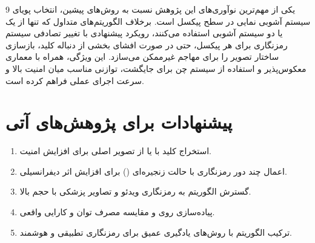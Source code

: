یکی از مهم‌ترین نوآوری‌های این پژوهش نسبت به روش‌های پیشین، انتخاب پویای 9 سیستم آشوبی نمایی در سطح پیکسل است. برخلاف الگوریتم‌های متداول که تنها از یک یا دو سیستم آشوبی استفاده می‌کنند، رویکرد پیشنهادی با تغییر تصادفی سیستم رمزنگاری برای هر پیکسل، حتی در صورت افشای بخشی از دنباله کلید، بازسازی ساختار تصویر را برای مهاجم غیرممکن می‌سازد. این ویژگی، همراه با معماری معکوس‌پذیر و استفاده از سیستم چن برای جایگشت، توازنی مناسب میان امنیت بالا و سرعت اجرای عملی فراهم کرده است.

\section{پیشنهادات برای پژوهش‌های آتی}
\begin{enumerate}
    \item استخراج کلید با  یا  از تصویر اصلی برای افزایش امنیت.
    \item اعمال چند دور رمزنگاری با حالت زنجیره‌ای () برای افزایش اثر دیفرانسیلی.
    \item گسترش الگوریتم به رمزنگاری ویدئو و تصاویر پزشکی با حجم بالا.
    \item پیاده‌سازی روی  و مقایسه مصرف توان و کارایی واقعی.
    \item ترکیب الگوریتم با روش‌های یادگیری عمیق برای رمزنگاری تطبیقی و هوشمند.
\end{enumerate}
